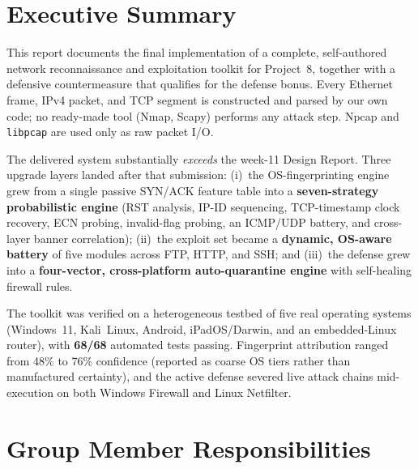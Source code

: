 \documentclass[11pt,a4paper]{article}
\begin{document}
\setcounter{page}{1}

\section*{\sffamily\color{accent}Executive Summary}

This report documents the final implementation of a complete, self-authored network
reconnaissance and exploitation toolkit for Project~8, together with a defensive
countermeasure that qualifies for the defense bonus. Every Ethernet frame, IPv4 packet,
and TCP segment is constructed and parsed by our own code; no ready-made tool
(Nmap, Scapy) performs any attack step. Npcap and \texttt{libpcap} are used only as raw
packet I/O.

The delivered system substantially \emph{exceeds} the week-11 Design Report. Three upgrade
layers landed after that submission: (i)~the OS-fingerprinting engine grew from a single
passive SYN/ACK feature table into a \textbf{seven-strategy probabilistic engine}
(RST analysis, IP-ID sequencing, TCP-timestamp clock recovery, ECN probing, invalid-flag
probing, an ICMP/UDP battery, and cross-layer banner correlation); (ii)~the exploit set
became a \textbf{dynamic, OS-aware battery} of five modules across FTP, HTTP, and SSH; and
(iii)~the defense grew into a \textbf{four-vector, cross-platform auto-quarantine engine}
with self-healing firewall rules.

The toolkit was verified on a heterogeneous testbed of five real operating systems
(Windows~11, Kali~Linux, Android, iPadOS/Darwin, and an embedded-Linux router), with
\textbf{68/68} automated tests passing. Fingerprint attribution ranged from 48\% to 76\%
confidence (reported as coarse OS tiers rather than manufactured certainty), and the
active defense severed live attack chains mid-execution on both Windows Firewall and Linux
Netfilter.

\section*{\sffamily\color{accent}Group Member Responsibilities}
\end{document}
